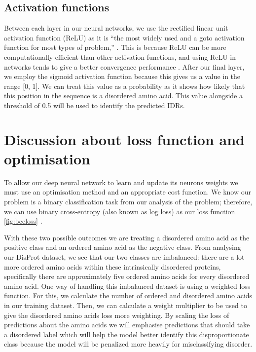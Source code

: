 \documentclass{l4proj}
\begin{document}
\subsection{Activation functions}

Between each layer in our neural networks, we use the rectified linear unit activation function (ReLU) as it is “the most widely used and a goto activation function for most types of problem,” \citep{Keerthi:22}. This is because ReLU can be more computationally efficient than other activation functions, and using ReLU in networks tends to give a better convergence performance \citep{BerenLuthien:16}. After our final layer, we employ the sigmoid activation function because this gives us a value in the range [0, 1]. We can treat this value as a probability as it shows how likely that this position in the sequence is a disordered amino acid. This value alongside a threshold of 0.5 will be used to identify the predicted IDRs.

\section{Discussion about loss function and optimisation}
\label{sec:loss design}
To allow our deep neural network to learn and update its neurons weights we must use an optimisation method and an appropriate cost function. We know our problem is a binary classification task from our analysis of the problem; therefore, we can use binary cross-entropy (also known as log loss) as our loss function \ref{fig:bceloss} \citep{Godoy:18}.  

With these two possible outcomes we are treating a disordered amino acid as the positive class and an ordered amino acid as the negative class. From analysing our DisProt dataset, we see that our two classes are imbalanced: there are a lot more ordered amino acids within these intrinsically disordered proteins, specifically there are approximately five ordered amino acids for every disordered amino acid. One way of handling this imbalanced dataset is using a weighted loss function. For this, we calculate the number of ordered and disordered amino acids in our training dataset. Then, we can calculate a weight multiplier to be used to give the disordered amino acids loss more weighting. By scaling the loss of predictions about the amino acids we will emphasise predictions that should take a disordered label which will help the model better identify this disproportionate class because the model will be penalized more heavily for misclassifying disorder. 
\end{document}
